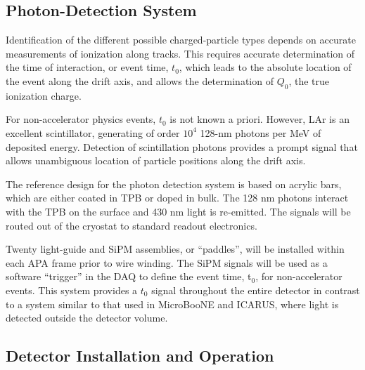 


\subsection{Photon-Detection System}

Identification of the different possible charged-particle types 
depends on accurate measurements of ionization along tracks. This requires accurate determination
of the time of interaction, or event time, $t_0$, which leads to the absolute location 
of the event along the drift axis, and allows the determination of $Q_0$,  the 
true ionization charge.

For non-accelerator physics events, $t_0$ is not known a priori.  
However, LAr is an excellent scintillator, generating of 
order $10^{4}$ 128-nm photons per MeV of deposited energy.  
Detection of scintillation photons 
provides a prompt signal that allows unambiguous 
location of particle positions along the drift axis.

The reference design for the photon detection system is based on acrylic bars, which are either coated in TPB or doped in bulk. The 128 nm photons interact with the TPB on the surface and 430 nm light is re-emitted. 
The signals will be routed out of the cryostat to standard readout electronics.

Twenty light-guide and SiPM assemblies, or ``paddles'', will be installed within each APA frame prior to wire winding. The SiPM signals will be used as a software ``trigger'' in the DAQ to define the event time, t$_0$, for non-accelerator events. This system provides a $t_0$ signal throughout the entire detector in contrast to a system similar to that used in MicroBooNE and ICARUS, where light is detected outside the detector volume. 


\subsection{Detector Installation and Operation}
\label{sec:det-install}

